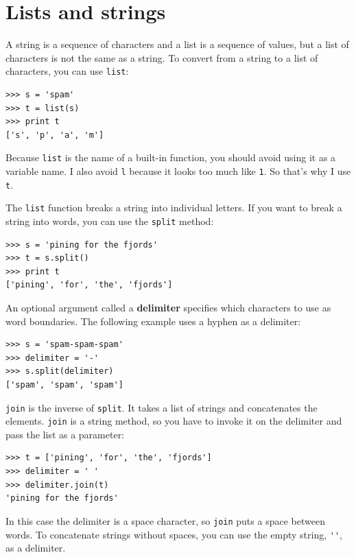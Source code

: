 \documentclass[10pt]{book}
\begin{document}
\section{Lists and strings}

A string is a sequence of characters and a list is a sequence
of values, but a list of characters is not the same as a
string.  To convert from a string to a list of characters,
you can use {\tt list}:

\begin{verbatim}
>>> s = 'spam'
>>> t = list(s)
>>> print t
['s', 'p', 'a', 'm']
\end{verbatim}
%
Because {\tt list} is the name of a built-in function, you should
avoid using it as a variable name.  I also avoid {\tt l} because
it looks too much like {\tt 1}.  So that's why I use {\tt t}.

The {\tt list} function breaks a string into individual letters.  If
you want to break a string into words, you can use the {\tt split}
method:

\begin{verbatim}
>>> s = 'pining for the fjords'
>>> t = s.split()
>>> print t
['pining', 'for', 'the', 'fjords']
\end{verbatim}
%
An optional argument called a {\bf delimiter} specifies which
characters to use as word boundaries.
The following example
uses a hyphen as a delimiter:

\begin{verbatim}
>>> s = 'spam-spam-spam'
>>> delimiter = '-'
>>> s.split(delimiter)
['spam', 'spam', 'spam']
\end{verbatim}
%
{\tt join} is the inverse of {\tt split}.  It
takes a list of strings and
concatenates the elements.  {\tt join} is a string method,
so you have to invoke it on the delimiter and pass the
list as a parameter:

\begin{verbatim}
>>> t = ['pining', 'for', 'the', 'fjords']
>>> delimiter = ' '
>>> delimiter.join(t)
'pining for the fjords'
\end{verbatim}
%
In this case the delimiter is a space character, so
{\tt join} puts a space between words.  To concatenate
strings without spaces, you can use the empty string,
\verb"''", as a delimiter. 
\end{document}
